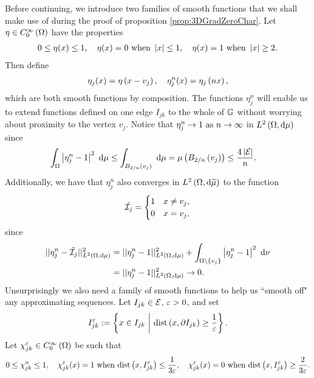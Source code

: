 Before continuing, we introduce two families of smooth functions that we shall make use of during the proof of proposition \ref{prop:3DGradZeroChar}.
Let $\eta\in C^{\infty}_{0}\left( \Omega \right)$ have the properties
\begin{align*}
	0 \leq \eta(x) \leq 1, \quad
	\eta(x) = 0 \text{ when } \left\lvert x \right\rvert \leq 1, \quad
	\eta(x) = 1 \text{ when } \left\lvert x \right\rvert \geq 2.
\end{align*}
Then define
\begin{align} \label{eq:SmoothEtaDef}
	\eta_j(x) = \eta\left( x-v_j \right), \quad
	\eta_j^n(x) = \eta_j\left( nx \right),
\end{align}
which are both smooth functions by composition.
The functions $\eta_j^n$ will enable us to extend functions defined on one edge $I_{jk}$ to the whole of $\mathbb{G}$ without worrying about proximity to the vertex $v_j$.
Notice that $\eta_j^n\rightarrow 1 \ \text{as} \ n \rightarrow\infty$ in $L^{2}\left( \Omega,\mathrm{d} \mu \right)$ since
\begin{align*}
	\int_{\Omega} \left\lvert \eta_j^n - 1 \right\rvert^2  \ \mathrm{d}\mu &\leq
	\int_{ B_{2/n}\left( v_j \right) } \ \mathrm{d}\mu
	= \mu\left(  B_{2/n}\left( v_j \right)  \right) \leq \frac{4\left\lvert \mathcal{E} \right\rvert}{n}.
\end{align*}
Additionally, we have that $\eta_j^n$ also converges in $L^{2}\left( \Omega,\mathrm{d} \widetilde{\mu} \right)$ to the function
\begin{align*}
	\tilde{\mathcal{I}_{j}} = \begin{cases} 1 & x\neq v_j, \\ 0 & x=v_j, \end{cases}
\end{align*}
since
\begin{align*}
	\lvert\lvert \eta_j^n - \tilde{\mathcal{I}_{j}} \rvert\rvert_{L^{2}\left( \Omega,\mathrm{d} \mu \right)}^2
	&= \lvert\lvert \eta_j^n - 1 \rvert\rvert_{L^{2}\left( \Omega,\mathrm{d} \mu \right)}^2
	+ \int_{\Omega\setminus\left\{ v_j \right\}} \left\lvert \eta_j^n - 1 \right\rvert^2  \ \mathrm{d}\nu \\
	&= \lvert\lvert \eta_j^n - 1 \rvert\rvert_{L^{2}\left( \Omega,\mathrm{d} \mu \right)}^2 \rightarrow 0.
\end{align*}
Unsurprisingly we also need a family of smooth functions to help us ``smooth off" any approximating sequences.
Let $I_{jk}\in\mathcal{E}$, $\varepsilon>0$, and set
\begin{align} \label{eq:ShortenedEdgeDef}
	I_{jk}^\varepsilon := \left\{  x\in I_{jk} \ \middle\vert \  \mathrm{dist}\left( x,\partial I_{jk} \right)\geq\frac{1}{\varepsilon}  \right\}.
\end{align}
Let $\chi_{jk}^\varepsilon\in C^{\infty}_{0}\left( \Omega \right)$ be such that
\begin{align} \label{eq:SmoothChiDef}
	0 \leq \chi_{jk}^n \leq 1, \quad
	\chi_{jk}^\varepsilon(x) = 1 \text{ when } \mathrm{dist}\left( x, I_{jk}^\varepsilon \right)\leq \frac{1}{3\varepsilon}, \quad
	\chi_{jk}^\varepsilon(x) = 0 \text{ when } \mathrm{dist}\left( x, I_{jk}^\varepsilon \right)\geq \frac{2}{3\varepsilon}.
\end{align}
